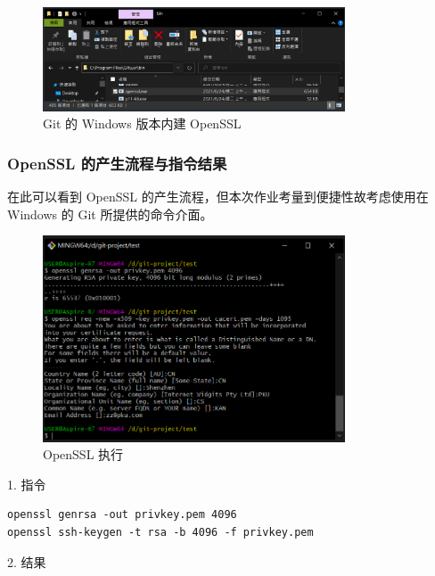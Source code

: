 \begin{figure}[htb]
\centering 
\includegraphics[width=0.80\textwidth]{img/ch1s2m2.png} 
\caption{Git 的 Windows 版本内建 OpenSSL}
\label{Test}
\end{figure}

\subsubsection{OpenSSL 的产生流程与指令结果}

在此可以看到 OpenSSL 的产生流程，但本次作业考量到便捷性故考虑使用在 Windows 的 Git 所提供的命令介面。

\begin{figure}[htb]
\centering 
\includegraphics[width=0.80\textwidth]{img/ch1s2m3.png} 
\caption{OpenSSL 执行}
\label{Test}
\end{figure}

1. 指令

\begin{Verbatim}
openssl genrsa -out privkey.pem 4096
openssl ssh-keygen -t rsa -b 4096 -f privkey.pem
\end{Verbatim}

2. 结果


